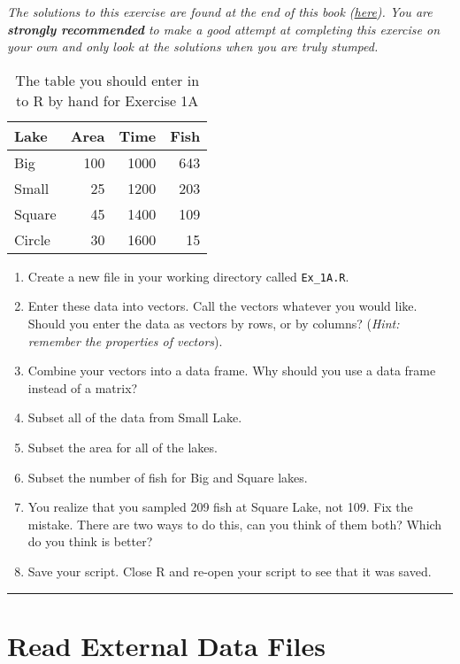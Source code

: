 \documentclass[]{book}
\providecommand{\tightlist}{%
  \setlength{\itemsep}{0pt}\setlength{\parskip}{0pt}}
\begin{document}
\emph{The solutions to this exercise are found at the end of this book (\protect\hyperlink{ex1a-answers}{here}). You are \textbf{strongly recommended} to make a good attempt at completing this exercise on your own and only look at the solutions when you are truly stumped.}

\begin{table}

\caption{\label{tab:ex-1-table-pdf}The table you should enter in to R by hand for Exercise 1A}
\centering
\begin{tabular}[t]{l|r|r|r}
\hline
Lake & Area & Time & Fish\\
\hline
Big & 100 & 1000 & 643\\
\hline
Small & 25 & 1200 & 203\\
\hline
Square & 45 & 1400 & 109\\
\hline
Circle & 30 & 1600 & 15\\
\hline
\end{tabular}
\end{table}

\begin{enumerate}
\def\labelenumi{\arabic{enumi}.}
\tightlist
\item
  Create a new file in your working directory called \texttt{Ex\_1A.R}.
\item
  Enter these data into vectors. Call the vectors whatever you would like. Should you enter the data as vectors by rows, or by columns? (\emph{Hint: remember the properties of vectors}).
\item
  Combine your vectors into a data frame. Why should you use a data frame instead of a matrix?
\item
  Subset all of the data from Small Lake.
\item
  Subset the area for all of the lakes.
\item
  Subset the number of fish for Big and Square lakes.
\item
  You realize that you sampled 209 fish at Square Lake, not 109. Fix the mistake. There are two ways to do this, can you think of them both? Which do you think is better?
\item
  Save your script. Close R and re-open your script to see that it was saved.
\end{enumerate}

\begin{center}\rule{0.5\linewidth}{\linethickness}\end{center}

\hypertarget{read}{%
\section{Read External Data Files}\label{read}}
\end{document}
